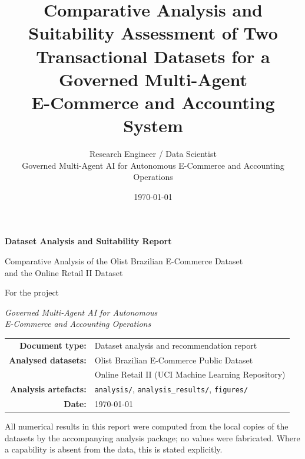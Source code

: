 \documentclass[11pt,a4paper]{article}
\title{\textbf{Comparative Analysis and Suitability Assessment of Two\\Transactional Datasets for a Governed Multi-Agent\\E-Commerce and Accounting System}}
\author{Research Engineer / Data Scientist\\\small Governed Multi-Agent AI for Autonomous E-Commerce and Accounting Operations}
\date{\today}
\newcommand{\code}[1]{\texttt{#1}}
\begin{document}
\begin{titlepage}
\centering
\vspace*{1.5cm}
{\Huge\bfseries Dataset Analysis and Suitability Report\par}
\vspace{0.6cm}
{\Large Comparative Analysis of the Olist Brazilian E-Commerce Dataset\\[2pt] and the Online Retail II Dataset\par}
\vspace{1.2cm}
{\large For the project\par}
\vspace{0.3cm}
{\Large\itshape Governed Multi-Agent AI for Autonomous\\E-Commerce and Accounting Operations\par}
\vspace{2.0cm}
\vfill
\begin{tabular}{rl}

\textbf{Document type:} & Dataset analysis and recommendation report \\[4pt]
\textbf{Analysed datasets:} & Olist Brazilian E-Commerce Public Dataset \\
 & Online Retail II (UCI Machine Learning Repository) \\[4pt]
\textbf{Analysis artefacts:} & \code{analysis/}, \code{analysis\_results/}, \code{figures/} \\[4pt]
\textbf{Date:} & \today \\
\end{tabular}
\vfill
{\small All numerical results in this report were computed from the local copies of the datasets by the accompanying analysis package; no values were fabricated. Where a capability is absent from the data, this is stated explicitly.}
\end{titlepage}
\end{document}
